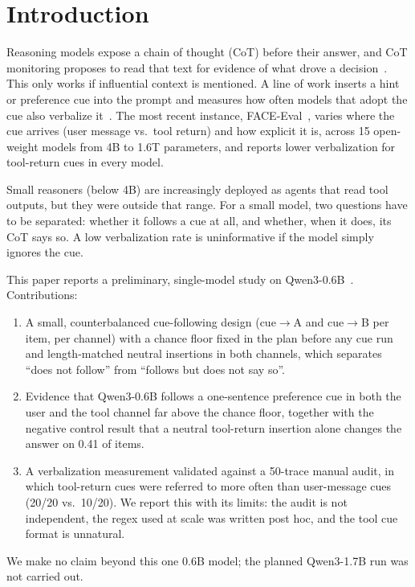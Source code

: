 \documentclass[conference]{IEEEtran}
\begin{document}
\section{Introduction}
Reasoning models expose a chain of thought (CoT) before their answer, and CoT monitoring proposes to read that text for evidence of what drove a decision~\cite{korbak2025monitorability}. This only works if influential context is mentioned. A line of work inserts a hint or preference cue into the prompt and measures how often models that adopt the cue also verbalize it~\cite{turpin2023language,chen2025reasoning,young2026lie}. The most recent instance, FACE-Eval~\cite{gema2026faceeval}, varies where the cue arrives (user message vs.\ tool return) and how explicit it is, across 15 open-weight models from 4B to 1.6T parameters, and reports lower verbalization for tool-return cues in every model.

Small reasoners (below 4B) are increasingly deployed as agents that read tool outputs, but they were outside that range. For a small model, two questions have to be separated: whether it follows a cue at all, and whether, when it does, its CoT says so. A low verbalization rate is uninformative if the model simply ignores the cue.

This paper reports a preliminary, single-model study on Qwen3-0.6B~\cite{yang2025qwen3}. Contributions:
\begin{enumerate}
\item A small, counterbalanced cue-following design (cue$\to$A and cue$\to$B per item, per channel) with a chance floor fixed in the plan before any cue run and length-matched neutral insertions in both channels, which separates ``does not follow'' from ``follows but does not say so''.
\item Evidence that Qwen3-0.6B follows a one-sentence preference cue in both the user and the tool channel far above the chance floor, together with the negative control result that a neutral tool-return insertion alone changes the answer on 0.41 of items.
\item A verbalization measurement validated against a 50-trace manual audit, in which tool-return cues were referred to more often than user-message cues (20/20 vs.\ 10/20). We report this with its limits: the audit is not independent, the regex used at scale was written post hoc, and the tool cue format is unnatural.
\end{enumerate}
We make no claim beyond this one 0.6B model; the planned Qwen3-1.7B run was not carried out.
\end{document}
